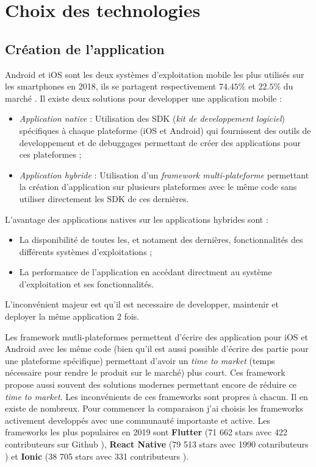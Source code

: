 \section{Choix des technologies}

\subsection{Création de l'application}

Android et iOS sont les deux systèmes d'exploitation mobile les plus utilisés sur les smartphones en 2018, ils se partagent respectivement $74.45\%$ et $22.5\%$ du marché \cite{market_share}. Il existe deux solutions pour developper une application mobile :

\begin{itemize}
  \item \textit{Application native} : Utilisation des SDK (\textit{kit de developpement logiciel}) spécifiques à chaque plateforme (iOS et Android) qui fournissent des outils de developpement et de debuggages permettant de créer des applications pour ces plateformes ;
  \item \textit{Application hybride} : Utilisation d'un \textit{framework multi-plateforme} permettant la création d'application sur plusieurs plateformes avec le même code sans utiliser directement les SDK de ces dernières.
\end{itemize}


L'avantage des applications natives sur les applications hybrides sont :

\begin{itemize}
  \item La disponibilité de toutes les, et notament des dernières, fonctionnalités des différents systèmes d'exploitations ;
  \item La performance de l'application en accédant directment au système d'exploitation et ses fonctionnalités.
\end{itemize}

L'inconvénient majeur est qu'il est necessaire de developper, maintenir et deployer la même application 2 fois.

Les framework mutli-plateformes permettent d'écrire des application pour iOS et Android avec les même code (bien qu'il est aussi possible d'écrire des partie pour une plateforme spécifique) permettant d'avoir un \textit{time to market} (temps nécessaire pour rendre le produit sur le marché) plus court. Ces framework propose aussi souvent des solutions modernes permettant encore de réduire ce \textit{time to market}. Les inconvénients de ces frameworks sont propres à chacun. Il en existe de nombreux. Pour commencer la comparaison j'ai choisis les frameworks activement developpés avec une communauté importante et active. Les frameworks les plus populaires en 2019 sont \textbf{Flutter} (71 662 stars avec 422 contributeurs sur Github \cite{flutter}), \textbf{React Native} (79 513 stars avec 1990 cotnributeurs \cite{react}) et \textbf{Ionic} (38 705 stars avec 331 contributeurs \cite{ionic}).

